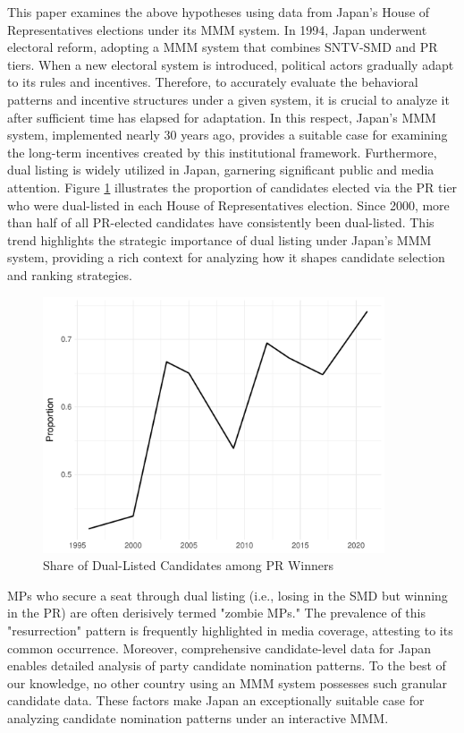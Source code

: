 \documentclass[a4paper, 11pt]{article}
\begin{document}
This paper examines the above hypotheses using data from Japan’s House of Representatives elections under its MMM system. In 1994, Japan underwent electoral reform, adopting a MMM system that combines SNTV-SMD and PR tiers. When a new electoral system is introduced, political actors gradually adapt to its rules and incentives. Therefore, to accurately evaluate the behavioral patterns and incentive structures under a given system, it is crucial to analyze it after sufficient time has elapsed for adaptation. In this respect, Japan’s MMM system, implemented nearly 30 years ago, provides a suitable case for examining the long-term incentives created by this institutional framework. Furthermore, dual listing is widely utilized in Japan, garnering significant public and media attention. Figure \ref{fig:dual} illustrates the proportion of candidates elected via the PR tier who were dual-listed in each House of Representatives election. Since 2000, more than half of all PR-elected candidates have consistently been dual-listed. This trend highlights the strategic importance of dual listing under Japan’s MMM system, providing a rich context for analyzing how it shapes candidate selection and ranking strategies.

\begin{figure}[!htbp]
	\includegraphics[width = 0.9\textwidth]{../figure/paper/dual_nomination.pdf}
	\caption{Share of Dual-Listed Candidates among PR Winners}
	\label{fig:dual}
\end{figure}

MPs who secure a seat through dual listing (i.e., losing in the SMD but winning in the PR) are often derisively termed "zombie MPs." The prevalence of this "resurrection" pattern is frequently highlighted in media coverage, attesting to its common occurrence. Moreover, comprehensive candidate-level data for Japan \citep{reedReedSmithJapaneseHouse2017} enables detailed analysis of party candidate nomination patterns. To the best of our knowledge, no other country using an MMM system possesses such granular candidate data. These factors make Japan an exceptionally suitable case for analyzing candidate nomination patterns under an interactive MMM.
\end{document}
